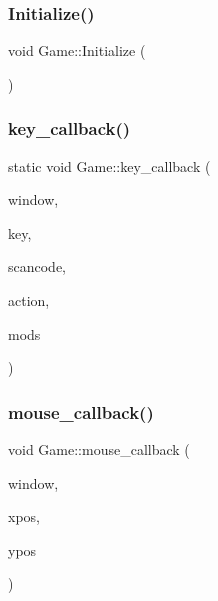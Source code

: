 \mbox{\label{classGame_adc01a7fae5261c95f7e6b41024e6c533}} 
\subsubsection{\texorpdfstring{Initialize()}{Initialize()}}
{\footnotesize\ttfamily void Game\+::\+Initialize (\begin{DoxyParamCaption}{ }\end{DoxyParamCaption})}

\mbox{\label{classGame_a1622ae34c02e33376dabde5294c9a8e8}} 
\subsubsection{\texorpdfstring{key\+\_\+callback()}{key\_callback()}}
{\footnotesize\ttfamily static void Game\+::key\+\_\+callback (\begin{DoxyParamCaption}\item[{G\+L\+F\+Wwindow $\ast$}]{window,  }\item[{int}]{key,  }\item[{int}]{scancode,  }\item[{int}]{action,  }\item[{int}]{mods }\end{DoxyParamCaption})\hspace{0.3cm}{\ttfamily [static]}}

\mbox{\label{classGame_ade7c4fb6814172307baa622f1b4bb566}} 
\subsubsection{\texorpdfstring{mouse\+\_\+callback()}{mouse\_callback()}}
{\footnotesize\ttfamily void Game\+::mouse\+\_\+callback (\begin{DoxyParamCaption}\item[{G\+L\+F\+Wwindow $\ast$}]{window,  }\item[{double}]{xpos,  }\item[{double}]{ypos }\end{DoxyParamCaption})}

